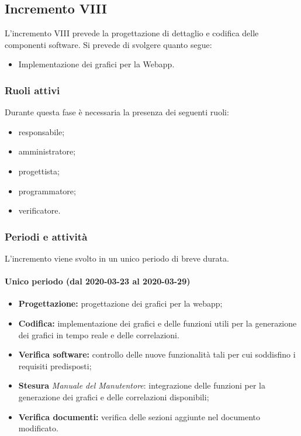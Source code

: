 		\subsection{Incremento VIII}
			
			L'incremento VIII prevede la progettazione di dettaglio e codifica delle componenti software. Si prevede di svolgere quanto segue:
			\begin{itemize}
				\item Implementazione dei grafici per la Webapp.
			\end{itemize}
			
			\subsubsection{Ruoli attivi}
			
				Durante questa fase è necessaria la presenza dei seguenti ruoli:
				\begin{itemize}
					\item responsabile;
					\item amministratore;
					\item progettista;
					\item programmatore;
					\item verificatore.
				\end{itemize}
			
			\subsubsection{Periodi e attività}
			
				L'incremento viene svolto in un unico periodo di breve durata.
				
				\paragraph{Unico periodo (dal 2020-03-23 al 2020-03-29)}
				
					\begin{itemize}
						\item \textbf{Progettazione:} progettazione dei grafici per la webapp;
						\item \textbf{Codifica:} implementazione dei grafici e delle funzioni utili per la generazione dei grafici in tempo reale e delle correlazioni.
						\item \textbf{Verifica software:} controllo delle nuove funzionalità tali per cui soddisfino i requisiti predisposti;
						\item \textbf{Stesura} \textit{Manuale del Manutentore}: integrazione delle funzioni per la generazione dei grafici e delle correlazioni disponibili;
						\item \textbf{Verifica documenti:} verifica delle sezioni aggiunte nel documento modificato.
					\end{itemize} 			

